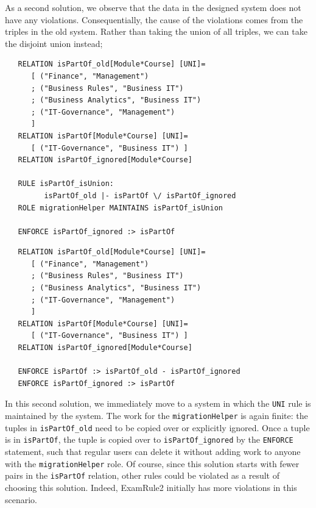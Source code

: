 \documentclass{elsarticle}
\begin{document}
As a second solution, we observe that the data in the designed system does not have any violations.
Consequentially, the cause of the violations comes from the triples in the old system.
Rather than taking the union of all triples, we can take the disjoint union instead;
\begin{verbatim}
   RELATION isPartOf_old[Module*Course] [UNI]=
      [ ("Finance", "Management")
      ; ("Business Rules", "Business IT")
      ; ("Business Analytics", "Business IT")
      ; ("IT-Governance", "Management")
      ]
   RELATION isPartOf[Module*Course] [UNI]=
      [ ("IT-Governance", "Business IT") ]
   RELATION isPartOf_ignored[Module*Course]
   
   RULE isPartOf_isUnion:
         isPartOf_old |- isPartOf \/ isPartOf_ignored
   ROLE migrationHelper MAINTAINS isPartOf_isUnion
   
   ENFORCE isPartOf_ignored :> isPartOf
\end{verbatim}

\begin{verbatim}
   RELATION isPartOf_old[Module*Course] [UNI]=
      [ ("Finance", "Management")
      ; ("Business Rules", "Business IT")
      ; ("Business Analytics", "Business IT")
      ; ("IT-Governance", "Management")
      ]
   RELATION isPartOf[Module*Course] [UNI]=
      [ ("IT-Governance", "Business IT") ]
   RELATION isPartOf_ignored[Module*Course]

   ENFORCE isPartOf :> isPartOf_old - isPartOf_ignored
   ENFORCE isPartOf_ignored :> isPartOf
\end{verbatim}
In this second solution, we immediately move to a system in which the \verb=UNI= rule is maintained by the system.
The work for the \verb=migrationHelper= is again finite: the tuples in \verb=isPartOf_old= need to be copied over or explicitly ignored.
Once a tuple is in \verb=isPartOf=, the tuple is copied over to \verb=isPartOf_ignored= by the \verb=ENFORCE= statement, such that regular users can delete it without adding work to anyone with the \verb=migrationHelper= role.
Of course, since this solution starts with fewer pairs in the \verb=isPartOf= relation, other rules could be violated as a result of choosing this solution.
Indeed, ExamRule2 initially has more violations in this scenario.
\end{document}
